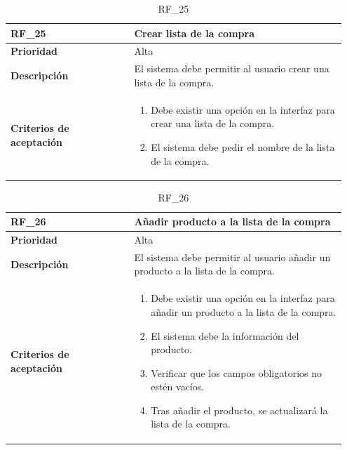 \begin{table}[htb!]
    \begin{tabular}{|p{0.35\linewidth}|p{0.6\linewidth}|}
        \hline
        \rowcolor[HTML]{C0C0C0}  
        \textbf{RF\_25} & \textbf{Crear lista de la compra} \\ 
        \hline
        \textbf{Prioridad} & Alta \\ 
        \hline
        \textbf{Descripción} & El sistema debe permitir al usuario crear una lista de la compra. \\ 
        \hline
        \vspace{0.5mm}
        \textbf{Criterios de aceptación} & 
        \begin{minipage}[t]{0.9\linewidth}
            \begin{enumerate}
                \item Debe existir una opción en la interfaz para crear una lista de la compra.
                \item El sistema debe pedir el nombre de la lista de la compra.
            \end{enumerate}
            \vspace{2mm}
        \end{minipage} \\ 
        \hline
    \end{tabular}
    \caption{RF\_25}
    \label{req:RF25}
\end{table}

\begin{table}[htb!]
    \begin{tabular}{|p{0.35\linewidth}|p{0.6\linewidth}|}
        \hline
        \rowcolor[HTML]{C0C0C0}  
        \textbf{RF\_26} & \textbf{Añadir producto a la lista de la compra} \\ 
        \hline
        \textbf{Prioridad} & Alta \\ 
        \hline
        \textbf{Descripción} & El sistema debe permitir al usuario añadir un producto a la lista de la compra. \\ 
        \hline
        \vspace{0.5mm}
        \textbf{Criterios de aceptación} & 
        \begin{minipage}[t]{0.9\linewidth}
            \begin{enumerate}
                \item Debe existir una opción en la interfaz para añadir un producto a la lista de la compra.
                \item El sistema debe la información del producto.
                \item Verificar que los campos obligatorios no estén vacíos.
                \item Tras añadir el producto, se actualizará la lista de la compra. 
            \end{enumerate}
            \vspace{2mm}
        \end{minipage} \\ 
        \hline
    \end{tabular}
    \caption{RF\_26}
    \label{req:RF26}
\end{table}


